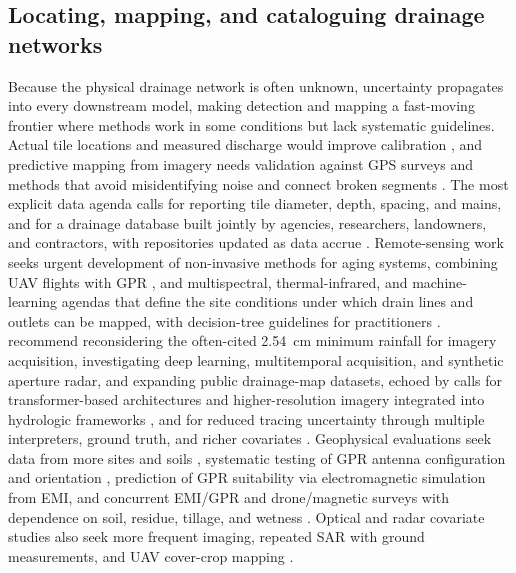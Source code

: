 \documentclass[11pt]{article}
\begin{document}
\subsection{Locating, mapping, and cataloguing drainage networks}

Because the physical drainage network is often unknown, uncertainty propagates
into every downstream model, making detection and mapping a fast-moving frontier
where methods work in some conditions but lack systematic guidelines. Actual tile
locations and measured discharge would improve calibration
\parencite{Amado2018}, and predictive mapping from imagery needs validation
against GPS surveys and methods that avoid misidentifying noise and connect broken
segments \parencite{Naz2009,Schilling2019}. The most explicit data agenda calls
for reporting tile diameter, depth, spacing, and mains, and for a drainage
database built jointly by agencies, researchers, landowners, and contractors,
with repositories updated as data accrue
\parencite{Zhou2025,Valayamkunnath2020}. Remote-sensing work seeks urgent
development of non-invasive methods for aging systems, combining UAV flights with
GPR \parencite{Wienken2024}, and multispectral, thermal-infrared, and
machine-learning agendas that define the site conditions under which drain lines
and outlets can be mapped, with decision-tree guidelines for practitioners
\parencite{Allred2020,Allred2021,Allred2022}. \textcite{Carlsen2024} recommend
reconsidering the often-cited 2.54~cm minimum rainfall for imagery acquisition,
investigating deep learning, multitemporal acquisition, and synthetic aperture
radar, and expanding public drainage-map datasets, echoed by calls for
transformer-based architectures and higher-resolution imagery integrated into
hydrologic frameworks \parencite{Wan2024}, and for reduced tracing uncertainty
through multiple interpreters, ground truth, and richer covariates
\parencite{Redoloza2023,Harris2018,Yimer2023}. Geophysical evaluations seek data
from more sites and soils \parencite{Allred2005}, systematic testing of GPR
antenna configuration and orientation \parencite{Allred2013}, prediction of GPR
suitability via electromagnetic simulation from EMI, and concurrent EMI/GPR and
drone/magnetic surveys with dependence on soil, residue, tillage, and wetness
\parencite{Koganti2020,Koganti2021,Jouen2018,Kratt2020,Allred2018b}. Optical and
radar covariate studies also seek more frequent imaging, repeated SAR with
ground measurements, and UAV cover-crop mapping
\parencite{Tlapáková2017,Meunier2001,Xu2018}.
\end{document}
